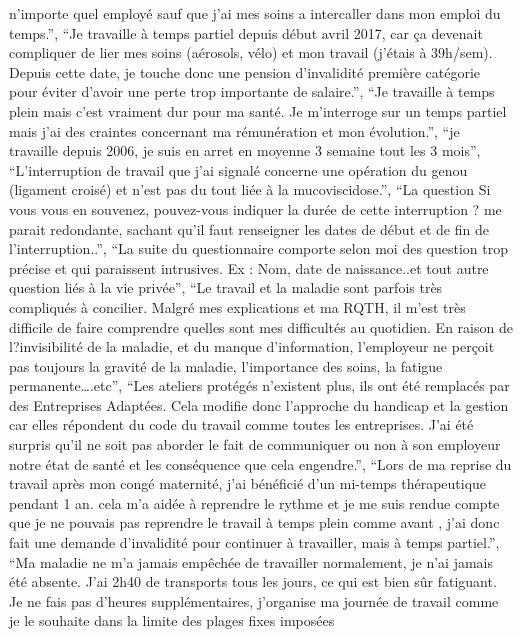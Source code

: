\documentclass[
  letterpaper,
  DIV=11,
  numbers=noendperiod]{scrartcl}
\begin{document}
\begin{itemize}
  n'importe quel employé sauf que j'ai mes soins a intercaller dans mon
  emploi du temps.'', ``Je travaille à temps partiel depuis début avril
  2017, car ça devenait compliquer de lier mes soins (aérosols, vélo) et
  mon travail (j'étais à 39h/sem). Depuis cette date, je touche donc une
  pension d'invalidité première catégorie pour éviter d'avoir une perte
  trop importante de salaire.'', ``Je travaille à temps plein mais c'est
  vraiment dur pour ma santé. Je m'interroge sur un temps partiel mais
  j'ai des craintes concernant ma rémunération et mon évolution.'', ``je
  travaille depuis 2006, je suis en arret en moyenne 3 semaine tout les
  3 mois'', ``L'interruption de travail que j'ai signalé concerne une
  opération du genou (ligament croisé) et n'est pas du tout liée à la
  mucoviscidose.'', ``La question Si vous vous en souvenez, pouvez-vous
  indiquer la durée de cette interruption ? me parait redondante,
  sachant qu'il faut renseigner les dates de début et de fin de
  l'interruption..'', ``La suite du questionnaire comporte selon moi des
  question trop précise et qui paraissent intrusives. Ex : Nom, date de
  naissance..et tout autre question liés à la vie privée'', ``Le travail
  et la maladie sont parfois très compliqués à concilier. Malgré mes
  explications et ma RQTH, il m'est très difficile de faire comprendre
  quelles sont mes difficultés au quotidien. En raison de l?invisibilité
  de la maladie, et du manque d'information, l'employeur ne perçoit pas
  toujours la gravité de la maladie, l'importance des soins, la fatigue
  permanente\ldots.etc'', ``Les ateliers protégés n'existent plus, ils
  ont été remplacés par des Entreprises Adaptées. Cela modifie donc
  l'approche du handicap et la gestion car elles répondent du code du
  travail comme toutes les entreprises. J'ai été surpris qu'il ne soit
  pas aborder le fait de communiquer ou non à son employeur notre état
  de santé et les conséquence que cela engendre.'', ``Lors de ma reprise
  du travail après mon congé maternité, j'ai bénéficié d'un mi-temps
  thérapeutique pendant 1 an. cela m'a aidée à reprendre le rythme et je
  me suis rendue compte que je ne pouvais pas reprendre le travail à
  temps plein comme avant , j'ai donc fait une demande d'invalidité pour
  continuer à travailler, mais à temps partiel.'', ``Ma maladie ne m'a
  jamais empêchée de travailler normalement, je n'ai jamais été absente.
  J'ai 2h40 de transports tous les jours, ce qui est bien sûr fatiguant.
  Je ne fais pas d'heures supplémentaires, j'organise ma journée de
  travail comme je le souhaite dans la limite des plages fixes imposées

\end{itemize}
\end{document}

